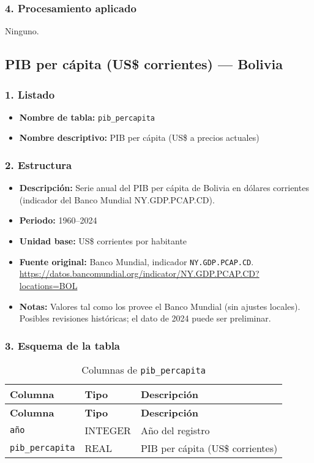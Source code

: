 \documentclass[12pt,a4paper]{article}
\begin{document}
\subsubsection*{4. Procesamiento aplicado}
Ninguno.
\subsection{PIB per cápita (US\$ corrientes) — Bolivia}

\subsubsection*{1. Listado}
\begin{itemize}
  \item \textbf{Nombre de tabla:} \texttt{pib\_percapita}
  \item \textbf{Nombre descriptivo:} PIB per cápita (US\$ a precios actuales)
\end{itemize}

\subsubsection*{2. Estructura}
\begin{itemize}
  \item \textbf{Descripción:} Serie anual del PIB per cápita de Bolivia en dólares corrientes (indicador del Banco Mundial NY.GDP.PCAP.CD).
  \item \textbf{Periodo:} 1960--2024
  \item \textbf{Unidad base:} US\$ corrientes por habitante
  \item \textbf{Fuente original:} Banco Mundial, indicador \texttt{NY.GDP.PCAP.CD}. \url{https://datos.bancomundial.org/indicator/NY.GDP.PCAP.CD?locations=BOL}
  \item \textbf{Notas:} Valores tal como los provee el Banco Mundial (sin ajustes locales). Posibles revisiones históricas; el dato de 2024 puede ser preliminar.
\end{itemize}

\subsubsection*{3. Esquema de la tabla}
\begin{longtable}{@{}lll@{}}
\caption{Columnas de \texttt{pib\_percapita}}\\
\toprule
\textbf{Columna} & \textbf{Tipo} & \textbf{Descripción} \\
\midrule
\endfirsthead
\toprule
\textbf{Columna} & \textbf{Tipo} & \textbf{Descripción} \\
\midrule
\endhead
\bottomrule
\endfoot
\texttt{año}             & INTEGER & Año del registro \\
\texttt{pib\_percapita}  & REAL    & PIB per cápita (US\$ corrientes) \\
\end{longtable}
\end{document}
